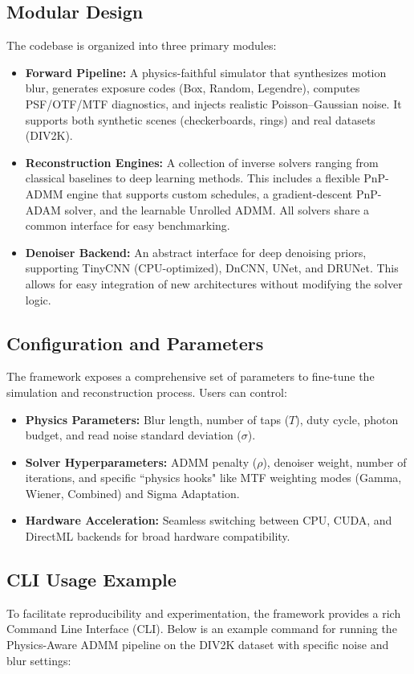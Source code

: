 \documentclass[10pt,journal,compsoc]{IEEEtran}
\begin{document}
\subsection{Modular Design}
The codebase is organized into three primary modules:
\begin{itemize}
    \item \textbf{Forward Pipeline:} A physics-faithful simulator that synthesizes motion blur, generates exposure codes (Box, Random, Legendre), computes PSF/OTF/MTF diagnostics, and injects realistic Poisson--Gaussian noise. It supports both synthetic scenes (checkerboards, rings) and real datasets (DIV2K).
    \item \textbf{Reconstruction Engines:} A collection of inverse solvers ranging from classical baselines to deep learning methods. This includes a flexible PnP-ADMM engine that supports custom schedules, a gradient-descent PnP-ADAM solver, and the learnable Unrolled ADMM. All solvers share a common interface for easy benchmarking.
    \item \textbf{Denoiser Backend:} An abstract interface for deep denoising priors, supporting TinyCNN (CPU-optimized), DnCNN, UNet, and DRUNet. This allows for easy integration of new architectures without modifying the solver logic.
\end{itemize}

\subsection{Configuration and Parameters}
The framework exposes a comprehensive set of parameters to fine-tune the simulation and reconstruction process. Users can control:
\begin{itemize}
    \item \textbf{Physics Parameters:} Blur length, number of taps ($T$), duty cycle, photon budget, and read noise standard deviation ($\sigma$).
    \item \textbf{Solver Hyperparameters:} ADMM penalty ($\rho$), denoiser weight, number of iterations, and specific ``physics hooks" like MTF weighting modes (Gamma, Wiener, Combined) and Sigma Adaptation.
    \item \textbf{Hardware Acceleration:} Seamless switching between CPU, CUDA, and DirectML backends for broad hardware compatibility.
\end{itemize}

\subsection{CLI Usage Example}
To facilitate reproducibility and experimentation, the framework provides a rich Command Line Interface (CLI). Below is an example command for running the Physics-Aware ADMM pipeline on the DIV2K dataset with specific noise and blur settings:
\end{document}

